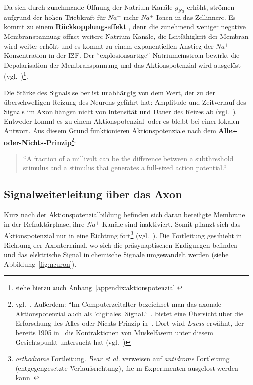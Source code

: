 {Da sich durch zunehmende Öffnung der Natrium-Kanäle $g_{Na}$ erhöht, strömen aufgrund der hohen Triebkraft für $Na^+$ mehr $Na^+$-Ionen in das Zellinnere. Es kommt zu einem \textbf{Rückkopplungseffekt} , denn die zunehmend weniger negative Membranspannung öffnet weitere Natrium-Kanäle, die Leitfähigkeit der Membran wird weiter erhöht und es kommt zu einem exponentiellen Anstieg der $Na^+$-Konzentration in der IZF. Der ``explosionsartige`` Natriumeinstrom bewirkt die Depolarisation der Membranspannung und das Aktionspotenzial wird ausgelöst (vgl.~\cite[69]{FE19})\footnote{
siehe hierzu auch Anhang~\ref{appendix:aktionspotenzial}
}.

Die Stärke des Signals selber ist unabhängig von dem Wert, der zu der überschwelligen Reizung des Neurons geführt hat: Amplitude und Zeitverlauf des Signals im Axon hängen nicht von Intensität und Dauer des Reizes ab (vgl.~\cite[75]{Jon19}). Entweder kommt es zu einem Aktionspotenzial, oder es bleibt bei einer lokalen Antwort. Aus diesem Grund funktionieren Aktionspotenziale nach dem \textbf{Alles-oder-Nichts-Prinzip}\footnote{vgl.~\cite[89]{BCP18}. Außerdem:
 ``Im Computerzeitalter bezeichnet man das axonale Aktionspotenzial auch als 'digitales' Signal.``~\cite[75]{Jon19}.  bietet eine Übersicht über die Erforschung des Alles-oder-Nichts-Prinzip in~\cite{Fra94}. Dort wird \textit{Lucas} erwähnt, der bereits 1905 in~\cite{Luc05} die Kontraktionen von Muskelfasern unter diesem Gesichtspunkt untersucht hat (vgl.~\cite[210]{Fra94})
}:

\blockquote[{\cite[157]{KSJ+13}}]{
 ``A fraction of a millivolt can be the difference between a subthreshold stimulus and a stimulus that generates a full-sized action potential.``
}

\subsection{Signalweiterleitung über das Axon}

Kurz nach der Aktionspotenzialbildung befinden sich daran beteiligte Membrane in der Refraktärphase, ihre $Na^+$-Kanäle sind inaktiviert. 
Somit pflanzt sich das Aktionspotenzial nur in eine Richtung fort\footnote{\textit{orthodrome} Fortleitung.
  \textit{Bear et al.} verweisen auf \textit{antidrome} Fortleitung (entgegengesetzte Verlaufsrichtung), die in Experimenten ausgelöst werden kann~\cite[106]{BCP18}
} (vgl.~\cite[106]{BCP18}).
Die Fortleitung geschieht in Richtung der Axonterminal, wo sich die präsynaptischen Endigungen befinden und das elektrische Signal in chemische Signale umgewandelt werden (siehe Abbildung~\ref{fig:neuron}).


}

